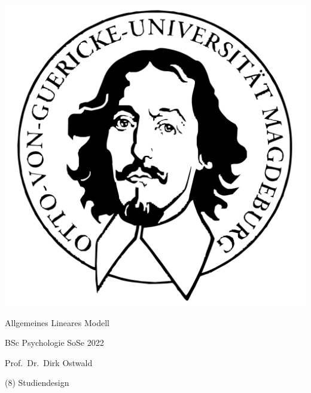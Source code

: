 \documentclass[
  8pt,
  ignorenonframetext,
]{beamer}
\author{}
\date{\vspace{-2.5em}}
\begin{document}
\begin{frame}[plain]{}
\protect\hypertarget{section}{}
\center

\begin{center}\includegraphics[width=0.2\linewidth]{8_Abbildungen/alm_8_otto} \end{center}

\vspace{2mm}

\huge

Allgemeines Lineares Modell \vspace{6mm}

\large

BSc Psychologie SoSe 2022

\vspace{6mm}
\normalsize

Prof.~Dr.~Dirk Ostwald
\end{frame}

\begin{frame}[plain]{}
\protect\hypertarget{section-1}{}
\center
\huge
\vfill

\noindent (8) Studiendesign \vfill
\end{frame}
\end{document}
